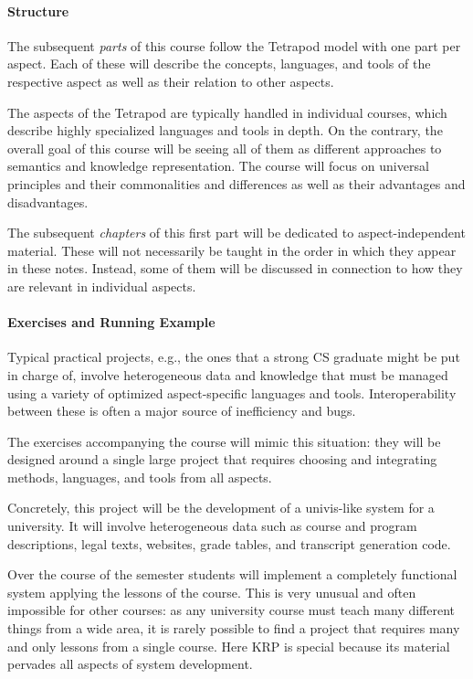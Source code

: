 \paragraph{Structure}

The subsequent \emph{parts} of this course follow the Tetrapod model with one part per aspect.
Each of these will describe the concepts, languages, and tools of the respective aspect as well as their relation to other aspects.

The aspects of the Tetrapod are typically handled in individual courses, which describe highly specialized languages and tools in depth.
On the contrary, the overall goal of this course will be seeing all of them as different approaches to semantics and knowledge representation.
The course will focus on universal principles and their commonalities and differences as well as their advantages and disadvantages.

The subsequent \emph{chapters} of this first part will be dedicated to aspect-independent material.
These will not necessarily be taught in the order in which they appear in these notes.
Instead, some of them will be discussed in connection to how they are relevant in individual aspects.

\paragraph{Exercises and Running Example}

Typical practical projects, e.g., the ones that a strong CS graduate might be put in charge of, involve heterogeneous data and knowledge that must be managed using a variety of optimized aspect-specific languages and tools.
Interoperability between these is often a major source of inefficiency and bugs.

The exercises accompanying the course will mimic this situation: they will be designed around a single large project that requires choosing and integrating methods, languages, and tools from all aspects.

Concretely, this project will be the development of a univis-like system for a university.
It will involve heterogeneous data such as course and program descriptions, legal texts, websites, grade tables, and transcript generation code.

Over the course of the semester students will implement a completely functional system applying the lessons of the course.
This is very unusual and often impossible for other courses: as any university course must teach many different things from a wide area, it is rarely possible to find a project that requires many and only lessons from a single course.
Here KRP is special because its material pervades all aspects of system development.

